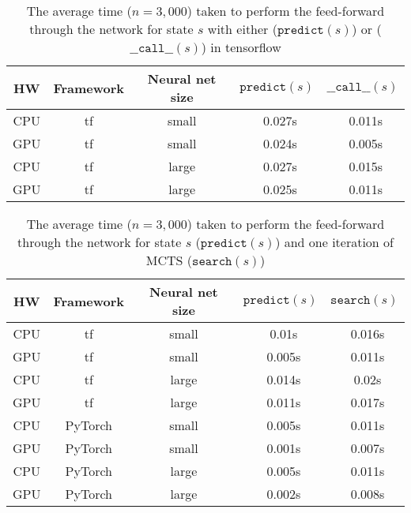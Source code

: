 \begin{table*}
    \begin{center}
        \begin{tabular}{ c|c|c|c|c }
            HW  & Framework & Neural net size & $\texttt{predict}(s)$ & $\texttt{\_\_call\_\_}(s)$ \\
            \hline
            \hline
            CPU & tf        & small           & ~0.027s               & ~0.011s                    \\
            GPU & tf        & small           & ~0.024s               & ~0.005s                    \\
            CPU & tf        & large           & ~0.027s               & ~0.015s                    \\
            GPU & tf        & large           & ~0.025s               & ~0.011s                    \\
        \end{tabular}
    \end{center}
    \caption{The average time ($n = 3,000$) taken to perform the feed-forward through the network for state $s$ with either ($\texttt{predict}(s)$) or ($\texttt{\_\_call\_\_}(s)$) in tensorflow}\label{tensorflow_predict_vs_call}
\end{table*}

\begin{table*}
    \begin{center}
        \begin{tabular}{ c|c|c|c|c }
            HW  & Framework & Neural net size & $\texttt{predict}(s)$ & $\texttt{search}(s)$ \\
            \hline
            \hline
            CPU & tf        & small           & ~0.01s                & ~0.016s              \\
            GPU & tf        & small           & ~0.005s               & ~0.011s              \\
            CPU & tf        & large           & ~0.014s               & ~0.02s               \\
            GPU & tf        & large           & ~0.011s               & ~0.017s              \\
            CPU & PyTorch   & small           & ~0.005s               & ~0.011s              \\
            GPU & PyTorch   & small           & ~0.001s               & ~0.007s              \\
            CPU & PyTorch   & large           & ~0.005s               & ~0.011s              \\
            GPU & PyTorch   & large           & ~0.002s               & ~0.008s              \\
        \end{tabular}
    \end{center}
    \caption{The average time ($n = 3,000$) taken to perform the feed-forward through the network for state $s$ ($\texttt{predict}(s)$) and one iteration of MCTS ($\texttt{search}(s)$)}\label{pytorch_vs_tensorflow_performance}
\end{table*}

